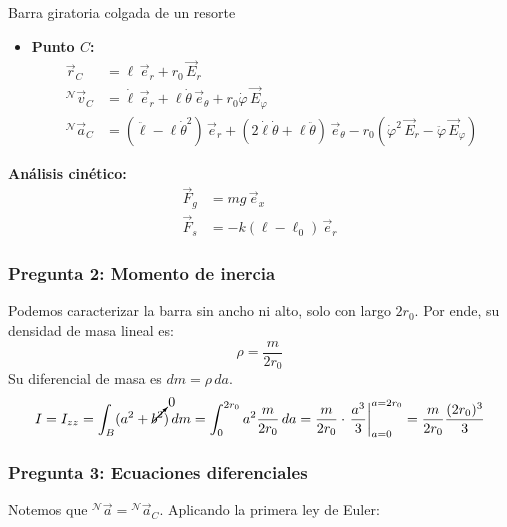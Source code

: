 \begin{solucion}{Barra giratoria colgada de un resorte}
\begin{itemize}
    \item \textbf{Punto $C$:}
    \begin{align*}
        \vec{r}_C &= \ell\, \vec{e}_r + r_0\, \vec{E}_r \\
        {}^{\mathcal{N}}\vec{v}_C &= \dot{\ell}\, \vec{e}_r + \ell \dot{\theta}\, \vec{e}_\theta + r_0 \dot{\varphi}\, \vec{E}_\varphi \\
        {}^{\mathcal{N}}\vec{a}_C &= (\ddot{\ell} - \ell \dot{\theta}^2)\, \vec{e}_r + (2\dot{\ell}\dot{\theta} + \ell\ddot{\theta})\, \vec{e}_\theta - r_0 (\dot{\varphi}^2\, \vec{E}_r - \ddot{\varphi}\, \vec{E}_\varphi)
    \end{align*}
\end{itemize}

\textbf{Análisis cinético:}
\begin{align*}
    \vec{F}_g &= m g\, \vec{e}_x \\
    \vec{F}_s &= -k(\ell - \ell_0)\, \vec{e}_r
\end{align*}

\subsubsection*{Pregunta 2: Momento de inercia}

Podemos caracterizar la barra sin ancho ni alto, solo con largo $2 r_0$. Por ende, su densidad de masa lineal es:
\[
\rho = \frac{m}{2 r_0}
\]
Su diferencial de masa es $dm = \rho\, da$.
\begin{equation*}
I = I_{zz} = \int_B (a^2 + \cancelto{0}{b^2})\, dm = \int_0^{2r_0} a^2 \frac{m}{2r_0}\, da = \frac{m}{2r_0} \cdot \left. \frac{a^3}{3} \right|_{a=0}^{a=2r_0} = \frac{m}{2r_0} \frac{(2r_0)^3}{3}
\end{equation*}

\subsubsection*{Pregunta 3: Ecuaciones diferenciales}

Notemos que ${}^{\mathcal{N}}\vec{a} = {}^{\mathcal{N}}\vec{a}_C$. Aplicando la primera ley de Euler:


\end{solucion}
